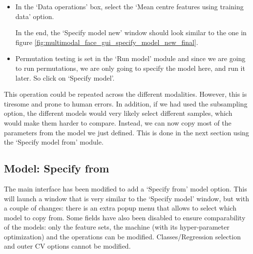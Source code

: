 \begin{itemize}
	\item In the `Data operations' box, select the `Mean centre features using training data' option.
	
In the end, the `Specify model new' window should look similar to the one in figure \ref{fig:multimodal_face_gui_specify_model_new_final}.
	
	\item Permutation testing is set in the `Run model' module and since we are going to run permutations, we are only going to specify the model here, and run it later. So click on `Specify model'.

\end{itemize}

This operation could be repeated across the different modalities. However, this is tiresome and prone to human errors. In addition, if we had used the subsampling option, the different models would very likely select different samples, which would make them harder to compare. Instead, we can now copy most of the parameters from the model we just defined. This is done in the next section using the `Specify model from' module.

\subsection{Model: Specify from}

The main interface has been modified to add a `Specify from' model option. This will launch a window that is very similar to the `Specify model' window, but with a couple of changes: there is an extra popup menu that allows to select which model to copy from. Some fields have also been disabled to ensure comparability of the models: only the feature sets, the machine (with its hyper-parameter optimization) and the operations can be modified. Classes/Regression selection and outer CV options cannot be modified.

